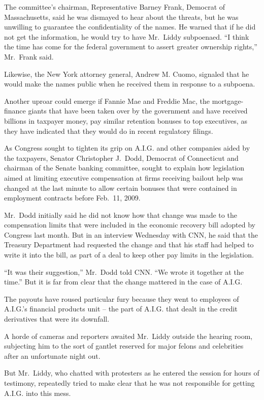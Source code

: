\documentclass[12pt,a4paper,onecolumn]{article}
\begin{document}
\begin{CJK*}{GBK}{song}
The committee's chairman, Representative Barney Frank, Democrat of Massachusetts, said he was
dismayed to hear about the threats, but he was unwilling to guarantee the confidentiality of the
names. He warned that if he did not get the information, he would try to have Mr.~Liddy subpoenaed.
``I think the time has come for the federal government to assert greater ownership rights,''
Mr.~Frank said.

Likewise, the New York attorney general, Andrew M. Cuomo, signaled that he would make the names
public when he received them in response to a subpoena.

Another uproar could emerge if Fannie Mae and Freddie Mac, the mortgage-finance giants that have
been taken over by the government and have received billions in taxpayer money, pay similar
retention bonuses to top executives, as they have indicated that they would do in recent regulatory
filings.

As Congress sought to tighten its grip on A.I.G. and other companies aided by the taxpayers, Senator
Christopher J.~Dodd, Democrat of Connecticut and chairman of the Senate banking committee, sought to
explain how legislation aimed at limiting executive compensation at firms receiving bailout help was
changed at the last minute to allow certain bonuses that were contained in employment contracts
before Feb.~11, 2009.

Mr.~Dodd initially said he did not know how that change was made to the compensation limits that
were included in the economic recovery bill adopted by Congress last month. But in an interview
Wednesday with CNN, he said that the Treasury Department had requested the change and that his staff
had helped to write it into the bill, as part of a deal to keep other pay limits in the legislation.

``It was their suggestion,'' Mr.~Dodd told CNN. ``We wrote it together at the time.'' But it is far
from clear that the change mattered in the case of A.I.G.

The payouts have roused particular fury because they went to employees of A.I.G.'s financial
products unit -- the part of A.I.G. that dealt in the credit derivatives that were its downfall.

A horde of cameras and reporters awaited Mr.~Liddy outside the hearing room, subjecting him to the
sort of gantlet reserved for major felons and celebrities after an unfortunate night out.

But Mr.~Liddy, who chatted with protesters as he entered the session for hours of testimony,
repeatedly tried to make clear that he was not responsible for getting A.I.G. into this mess.


\end{CJK*}
\end{document}
